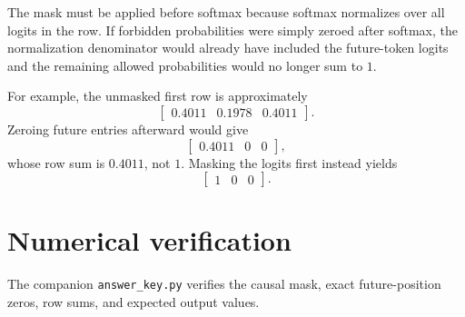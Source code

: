 \documentclass[11pt]{article}
\begin{document}
The mask must be applied before softmax because softmax normalizes over all logits in the row. If forbidden probabilities were simply zeroed after softmax, the normalization denominator would already have included the future-token logits and the remaining allowed probabilities would no longer sum to $1$.

For example, the unmasked first row is approximately
\[
\begin{bmatrix}0.4011&0.1978&0.4011\end{bmatrix}.
\]
Zeroing future entries afterward would give
\[
\begin{bmatrix}0.4011&0&0\end{bmatrix},
\]
whose row sum is $0.4011$, not $1$. Masking the logits first instead yields
\[
\begin{bmatrix}1&0&0\end{bmatrix}.
\]

\section*{Numerical verification}

The companion \texttt{answer\_key.py} verifies the causal mask, exact future-position zeros, row sums, and expected output values.
\end{document}
